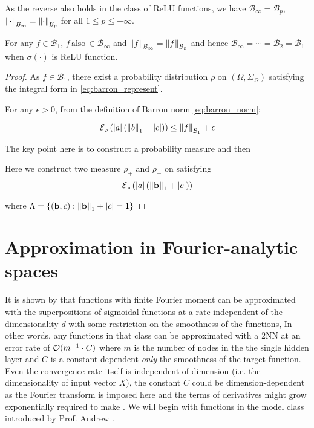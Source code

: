 As the reverse also holds in the class of ReLU functions,  we have
$\mathcal{B}_{\infty} = \mathcal{B}_p$, $\left\| {\cdot} \right\|_{\mathcal{B}_{\infty}} =
    \left\| {\cdot} \right\|_{\mathcal{B}_{p}}$  for all $1 \leq p \leq +\infty$.

\begin{lemma}
    \label{lamma:equivalence_barron_space}

    For any $f \in \mathcal{B}_1$, $f
        \,\text{also}\, \in \mathcal{B}_{\infty}$ and $\left\| {f} \right\|_{\mathcal{B}_{\infty}} =
        \left\| {f} \right\|_{\mathcal{B}_{p}}$ and hence $ \mathcal{B}_{\infty} = \cdots =
        \mathcal{B}_{2} = \mathcal{B}_1$ when $\sigma(\cdot)$ is ReLU function.
\end{lemma}

\begin{proof}
    As $f \in \mathcal{B}_1$,  there exist a probability distribution $\rho$ on
    $(\Omega, \Sigma_\Omega)$ satisfying the integral form in
    \eqref{eq:barron_represent}.

    For any $\epsilon > 0$, from the definition of Barron norm
    \eqref{eq:barron_norm}:

    \begin{equation}
        \ERWi{\rho}{\abs{a}(\norm{b}_1 + \abs{c})} \leq \barronnorm{f}{1} + \epsilon
    \end{equation}


    The key point here is to construct a probability measure and then

    Here we construct two measure $\rho_+$ and $\rho_-$ on satisfying
    \begin{equation*}
        \ERWi{\rho}{\abs{a}(\norm{\mathbf{b}}_1 + \abs{c})}
    \end{equation*}


    where $\Lambda = \{(\mathbf{b}, c): \left\| \mathbf{b} \right\|_1 + \left| c \right| = 1\}$
\end{proof}


\section{Approximation in Fourier-analytic spaces}
\label{sec:spectral_norm}

It is shown by \cite{barronUniversalApproximationBounds1993} that functions with
finite Fourier moment can be approximated with the superpositions of sigmoidal
functions at a rate independent of the dimensionality $d$ with some restriction
on the smoothness of the functions, In other words, any functions in that class
can be approximated with a 2NN at an error rate of $\mathcal{O}(m^{-1} \cdot C)$ where
$m$ is the number of nodes in the the single hidden layer and $C$ is a constant
dependent \textit{only} the smoothness of the target function. Even the
convergence rate itself is independent of dimension (i.e. the dimensionality of
input vector $X$), the constant $C$ could be dimension-dependent as the Fourier
transform is imposed here and the terms of derivatives might grow exponentially
required to make . We will begin with functions in the model class
introduced by Prof. Andrew \cite{barronUniversalApproximationBounds1993}.

